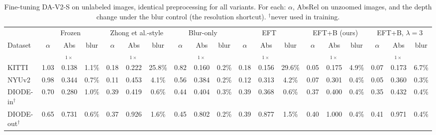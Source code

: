 \begin{table}[t]\centering\scriptsize
\caption{Fine-tuning DA-V2-S on unlabeled images, identical preprocessing for all variants. For each: $\alpha$, AbsRel on unzoomed images, and the depth change under the blur control (the resolution shortcut). $^\dagger$never used in training.}\label{tab:eft}
\setlength{\tabcolsep}{2.5pt}
\begin{tabular}{l ccc ccc ccc ccc ccc ccc}\toprule
& \multicolumn{3}{c}{Frozen} & \multicolumn{3}{c}{Zhong et al.-style} & \multicolumn{3}{c}{Blur-only} & \multicolumn{3}{c}{EFT} & \multicolumn{3}{c}{EFT+B (ours)} & \multicolumn{3}{c}{EFT+B, $\lambda{=}3$} \\
\cmidrule(lr){2-4}\cmidrule(lr){5-7}\cmidrule(lr){8-10}\cmidrule(lr){11-13}\cmidrule(lr){14-16}\cmidrule(lr){17-19}
Dataset & $\alpha$ & Abs$_{1\times}$ & blur & $\alpha$ & Abs$_{1\times}$ & blur & $\alpha$ & Abs$_{1\times}$ & blur & $\alpha$ & Abs$_{1\times}$ & blur & $\alpha$ & Abs$_{1\times}$ & blur & $\alpha$ & Abs$_{1\times}$ & blur \\ \midrule
KITTI & 1.03 & 0.138 & 1.1\% & 0.18 & 0.222 & 25.8\% & 0.82 & 0.160 & 0.2\% & 0.18 & 0.156 & 29.6\% & 0.05 & 0.175 & 4.9\% & 0.07 & 0.173 & 6.7\% \\
NYUv2 & 0.98 & 0.344 & 0.7\% & 0.11 & 0.453 & 4.1\% & 0.56 & 0.384 & 0.2\% & 0.12 & 0.313 & 4.2\% & 0.07 & 0.301 & 0.4\% & 0.05 & 0.360 & 0.3\% \\
DIODE-in$^\dagger$ & 0.70 & 0.280 & 1.0\% & 0.39 & 0.419 & 0.6\% & 0.44 & 0.404 & 0.3\% & 0.39 & 0.368 & 0.6\% & 0.37 & 0.400 & 0.4\% & 0.35 & 0.432 & 0.4\% \\
DIODE-out$^\dagger$ & 0.65 & 0.731 & 0.6\% & 0.37 & 0.926 & 1.6\% & 0.45 & 0.802 & 0.2\% & 0.39 & 0.877 & 1.5\% & 0.40 & 1.000 & 0.4\% & 0.41 & 0.971 & 0.4\% \\
\bottomrule\end{tabular}\end{table}
